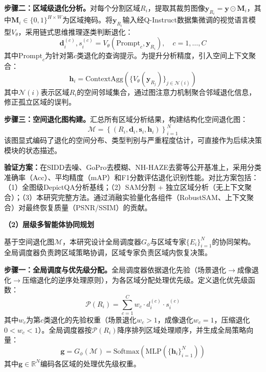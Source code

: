 \textbf{步骤二：区域级退化分析。}对每个分割区域$R_i$，提取其裁剪图像$\mathbf{y}_{R_i} = \mathbf{y} \odot \mathbf{M}_i$，其中$\mathbf{M}_i \in \{0,1\}^{H \times W}$为区域掩码。将$\mathbf{y}_{R_i}$输入经Q-Instruct数据集微调的视觉语言模型$V_{\theta}$，采用链式思维推理逐类判断退化：
\begin{equation}
\mathbf{d}_i^{(c)}, s_i^{(c)} = V_{\theta}\left(\text{Prompt}_c, \mathbf{y}_{R_i}\right), \quad c = 1, \ldots, C
\end{equation}
其中$\text{Prompt}_c$为针对第$c$类退化的查询提示。为提升分析精度，引入空间上下文聚合：
\begin{equation}
\mathbf{h}_i = \text{ContextAgg}\left(\{V_{\theta}(\mathbf{y}_{R_j})\}_{j \in \mathcal{N}(i)}\right)
\end{equation}
其中$\mathcal{N}(i)$表示区域$R_i$的空间邻域集合，通过图注意力机制聚合邻域退化信息，修正孤立区域的误判。

\textbf{步骤三：空间退化图构建。}汇总所有区域分析结果，构建结构化空间退化图：
\begin{equation}
\mathcal{M} = \left\{(R_i, \mathbf{d}_i, \mathbf{s}_i, \mathbf{h}_i)\right\}_{i=1}^{N}
\end{equation}
该图显式编码了退化的空间分布、类型判别与严重程度估计，可直接作为后续决策模块的状态描述。

\textbf{验证方案：}在SIDD去噪、GoPro去模糊、NH-HAZE去雾等公开基准上，采用分类准确率（Acc）、平均精度（mAP）和F1分数评估退化识别性能。对比方案包括：（1）全图级DepictQA分析基线；（2）SAM分割 + 独立区域分析（无上下文聚合）；（3）本研究完整方法。通过消融实验量化各组件（RobustSAM、上下文聚合）对最终恢复质量（PSNR/SSIM）的贡献。

\textbf{（2）层级多智能体协同规划}

基于空间退化图$\mathcal{M}$，本研究设计全局调度器$G_{\phi}$与区域专家$\{E_i\}_{i=1}^{N}$的协同架构。全局调度器负责跨区域策略协调，区域专家负责区域内恢复决策。

\textbf{步骤一：全局调度与优先级分配。}全局调度器依据退化先验（场景退化$\to$成像退化$\to$压缩退化的逆序处理原则\cite{mair}），为各区域分配处理优先级。定义退化优先级函数：
\begin{equation}
\mathcal{P}(R_i) = \sum_{c=1}^{C} w_c \cdot d_i^{(c)} \cdot s_i^{(c)}
\end{equation}
其中$w_c$为第$c$类退化的先验权重（场景退化$w_c > 1$，成像退化$w_c = 1$，压缩退化$0 < w_c < 1$）。全局调度器按$\mathcal{P}(R_i)$降序排列区域处理顺序，并生成全局策略向量：
\begin{equation}
\mathbf{g} = G_{\phi}(\mathcal{M}) = \text{Softmax}\left(\text{MLP}\left(\{\mathbf{h}_i\}_{i=1}^{N}\right)\right)
\end{equation}
其中$\mathbf{g} \in \mathbb{R}^{N}$编码各区域的处理优先级权重。

